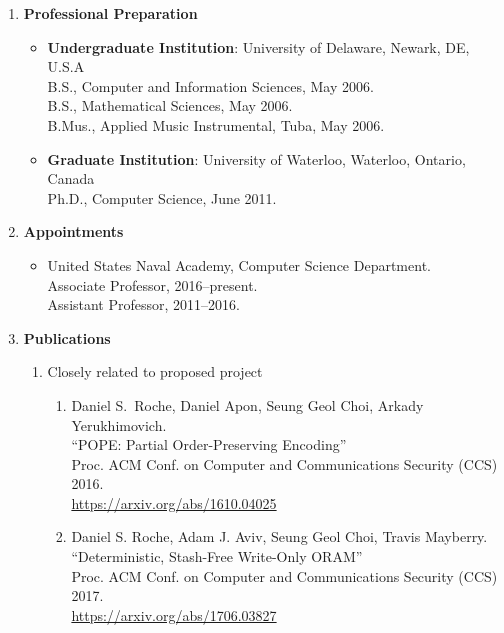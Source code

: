 \documentclass[letterpaper,10pt]{article}
\begin{document}

\begin{enumerate}[label=\textbf{(\alph*)}]

\item \textbf{Professional Preparation}
\begin{itemize}
  \item \textbf{Undergraduate Institution}: University of Delaware, Newark, DE, U.S.A\\
  B.S., Computer and Information Sciences, May 2006.\\
  B.S., Mathematical Sciences, May 2006.\\
  B.Mus., Applied Music Instrumental, Tuba, May 2006.

  \item \textbf{Graduate Institution}: University of Waterloo, Waterloo, Ontario, Canada\\
  Ph.D., Computer Science, June 2011.
\end{itemize}

\item \textbf{Appointments}
  \begin{itemize}
    \item United States Naval Academy, Computer Science Department.\\
      Associate Professor, 2016--present.\\
      Assistant Professor, 2011--2016.
  \end{itemize}

\item \textbf{Publications}

  \begin{enumerate}[label=(\roman*)]
    \item Closely related to proposed project
      \begin{enumerate}[label=\arabic*.]

        \item Daniel S.\ Roche, Daniel Apon, Seung Geol Choi,
          Arkady Yerukhimovich.\\
          ``POPE: Partial Order-Preserving Encoding''\\
          Proc. ACM Conf. on Computer and Communications Security (CCS) 2016.\\
          \url{https://arxiv.org/abs/1610.04025}

        \item Daniel S. Roche, Adam J. Aviv, Seung Geol Choi, Travis
          Mayberry.\\
          ``Deterministic, Stash-Free Write-Only ORAM''\\
          Proc. ACM Conf. on Computer and Communications Security (CCS) 2017.\\
          \url{https://arxiv.org/abs/1706.03827}


\end{enumerate}
\end{enumerate}
\end{enumerate}
\end{document}
